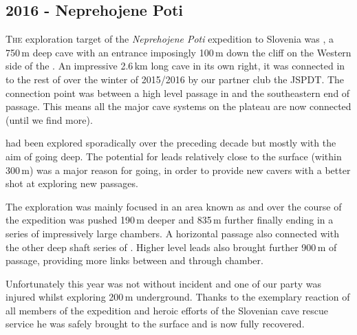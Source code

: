 \begin{tcolorbox}
\chapter{2016 - Neprehojene Poti}
	\lettrine{T}{he} exploration target of the \emph{Neprehojene Poti} expedition to Slovenia was , a 750\,m deep cave with an entrance imposingly 100\,m down the cliff on the Western side of the . An impressive 2.6\,km long cave in its own right, it was connected in to the rest of  over the winter of 2015/2016 by our partner club the JSPDT. The connection point was between a high level passage in  and the southeastern end of  passage. This means all the major cave systems on the plateau are now connected (until we find more).

	 had been explored sporadically over the preceding decade but mostly with the aim of going deep. The potential for leads relatively close to the surface (within 300\,m) was a major reason for going, in order to provide new cavers with a better shot at exploring new passages.

	The exploration was mainly focused in an area known as  and over the course of the expedition was pushed 190\,m deeper and 835\,m further finally ending in a series of impressively large chambers.  A horizontal passage also connected with the other deep shaft series of . Higher level leads also brought further 900\,m of passage, providing more links between  and  through  chamber.

	Unfortunately this year was not without incident and one of our party was injured whilst exploring 200\,m underground. Thanks to the exemplary reaction of all members of the expedition and heroic efforts of the Slovenian cave rescue service he was safely brought to the surface and is now fully recovered.
\end{tcolorbox}

